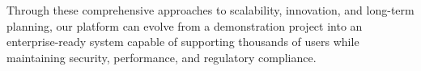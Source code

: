 \documentclass{article}
\begin{document}
Through these comprehensive approaches to scalability, innovation, and long-term planning, our platform can evolve from a demonstration project into an enterprise-ready system capable of supporting thousands of users while maintaining security, performance, and regulatory compliance.


\vfill\pagebreak



\end{document}
